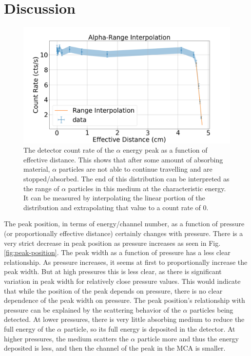 \section{Discussion}

\begin{figure}
\centering
\includegraphics[width=\textwidth]{count_rate.png}
\caption{The detector count rate of the $\alpha$ energy peak as a function of effective distance. This shows that after some amount of absorbing material, $\alpha$ particles are not able to continue travelling and are stopped/absorbed. The end of this distribution can be interpreted as the range of $\alpha$ particles in this medium at the characteristic energy. It can be measured by interpolating the linear portion of the distribution and extrapolating that value to a count rate of 0.}
\label{fig:count-rate}
\end{figure}

The peak position, in terms of energy/channel number, as a function of pressure (or proportionally effective distance) certainly changes with pressure. There is a very strict decrease in peak position as pressure increases as seen in Fig. \ref{fig:peak-position}. The peak width as a function of pressure has a less clear relationship. As pressure increases, it seems at first to proportionally increase the peak width. But at high pressures this is less clear, as there is significant variation in peak width for relatively close pressure values. This would indicate that while the position of the peak depends on pressure, there is no clear dependence of the peak width on pressure. The peak position’s relationship with pressure can be explained by the scattering behavior of the $\alpha$ particles being detected. At lower pressures, there is very little absorbing medium to reduce the full energy of the $\alpha$ particle, so its full energy is deposited in the detector. At higher pressures, the medium scatters the $\alpha$ particle more and thus the energy deposited is less, and then the channel of the peak in the MCA is smaller.

